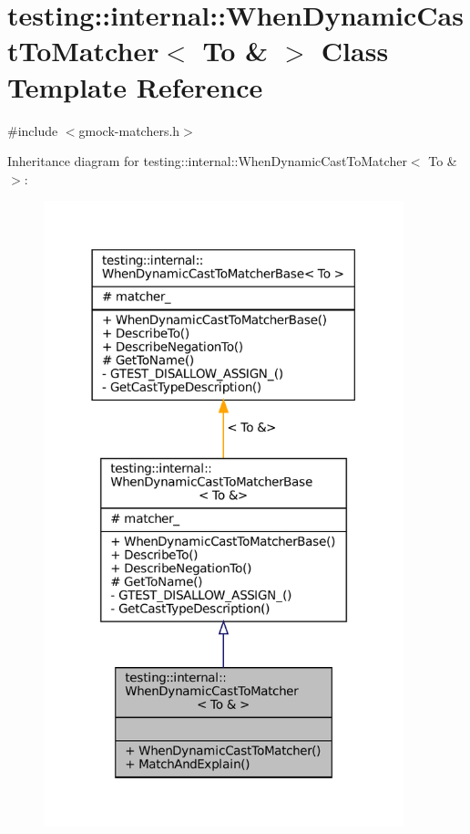 \hypertarget{classtesting_1_1internal_1_1WhenDynamicCastToMatcher_3_01To_01_6_01_4}{}\section{testing\+:\+:internal\+:\+:When\+Dynamic\+Cast\+To\+Matcher$<$ To \& $>$ Class Template Reference}
\label{classtesting_1_1internal_1_1WhenDynamicCastToMatcher_3_01To_01_6_01_4}


{\ttfamily \#include $<$gmock-\/matchers.\+h$>$}



Inheritance diagram for testing\+:\+:internal\+:\+:When\+Dynamic\+Cast\+To\+Matcher$<$ To \& $>$\+:
\nopagebreak
\begin{figure}[H]
\begin{center}
\leavevmode
\includegraphics[width=296pt]{classtesting_1_1internal_1_1WhenDynamicCastToMatcher_3_01To_01_6_01_4__inherit__graph}
\end{center}
\end{figure}


